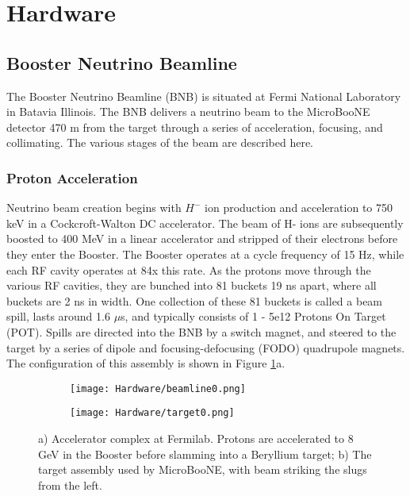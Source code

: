 %

\clearpage
\section{Hardware} \label{sec:hardware}
\subsection{Booster Neutrino Beamline}
The Booster Neutrino Beamline (BNB) is situated at Fermi National Laboratory in Batavia Illinois.  The BNB delivers a neutrino beam to the MicroBooNE detector 470 m from the target through a series of acceleration, focusing, and collimating. The various stages of the beam are described here.  
\subsubsection{Proton Acceleration}
Neutrino beam creation begins with $H^-$ ion production and acceleration to 750 keV in a Cockcroft-Walton DC accelerator. The beam of H- ions are subsequently boosted to 400 MeV in a linear accelerator and stripped of their electrons before they enter the Booster.  The Booster operates at a cycle frequency of 15 Hz, while each RF cavity operates at 84x this rate. As the protons move through the various RF cavities, they are bunched into 81 buckets 19 ns apart, where all buckets are 2 ns in width.  One collection of these 81 buckets is called a beam spill, lasts around 1.6 $\mu$s, and typically consists of 1 - 5e12 Protons On Target (POT). Spills are directed into the BNB by a switch magnet, and steered to the target by a series of dipole and focusing-defocusing (FODO) quadrupole magnets.  The configuration of this assembly is shown in Figure \ref{fig:beamline0}a. 

\begin{figure}[H]
  \begin{subfigure}[t]{0.3\textwidth}
    \centering
\texttt{[image: Hardware/beamline0.png]}
  \caption{ }
  \end{subfigure} 
  \hspace{3mm}
  \begin{subfigure}[t]{0.6\textwidth}
    \centering
\texttt{[image: Hardware/target0.png]}
  \caption{ }
  \end{subfigure} 
\caption{ a) Accelerator complex at Fermilab. Protons are accelerated to 8 GeV in the Booster before slamming into a Beryllium target; b) The target assembly used by MicroBooNE, with beam striking the slugs from the left. } 
\label{fig:beamline0}
\end{figure}

